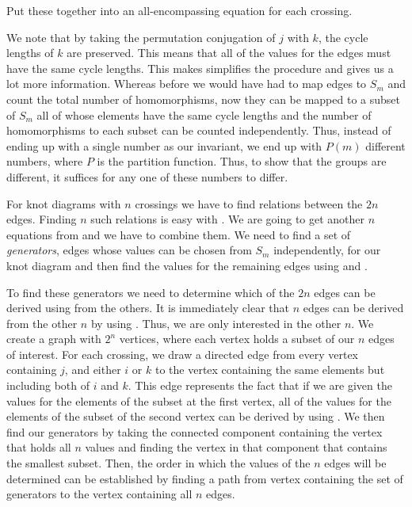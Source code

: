 \begin{paper}

Put these together into an all-encompassing equation for each crossing.



We note that by taking the permutation conjugation of $j$ with $k$, the cycle
lengths of $k$ are preserved.
This means that all of the values for the edges must have the same cycle
lengths.
This makes simplifies the procedure and gives us a lot more information.
Whereas before we would have had to map edges to $S_m$ and count the total
number of homomorphisms, now they can be mapped to a subset of $S_m$ all of
whose elements have the same cycle lengths and the number of homomorphisms
to each subset can be counted independently.
Thus, instead of ending up with a single number as our invariant, we end up with
$P(m)$ different numbers, where $P$ is the partition function.
Thus, to show that the groups are different, it suffices for any one of these
numbers to differ.

For knot diagrams with $n$ crossings we have to find relations between the $2n$
edges.
Finding $n$ such relations is easy with \eqUpper.
We are going to get another $n$ equations from \eqBoth and we have to combine them.
We need to find a set of \textit{generators}, edges whose values can be chosen
from $S_m$ independently, for our knot diagram and then find the values for the
remaining edges using \eqUpper and \eqBoth.

To find these generators we need to determine which of the $2n$ edges can be
derived using \eqBoth from the others.
It is immediately clear that $n$ edges can be derived from the other $n$ by
using \eqUpper.
Thus, we are only interested in the other $n$.
We create a graph with $2^n$ vertices, where each vertex holds a subset of our
$n$ edges of interest.
For each crossing, we draw a directed edge from every vertex containing $j$, and
either $i$ or $k$ to the vertex containing the same elements but including both
of $i$ and $k$.
This edge represents the fact that if we are given the values for the elements
of the subset at the first vertex, all of the values for the elements of the
subset of the second vertex can be derived by using \eqBoth.
We then find our generators by taking the connected component containing the
vertex that holds all $n$ values and finding the vertex in that component that
contains the smallest subset.
Then, the order in which the values of the $n$ edges will be determined can be
established by finding a path from vertex containing the set of generators to
the vertex containing all $n$ edges.


\end{paper}
